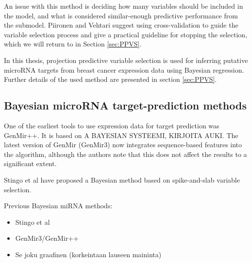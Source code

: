 An issue with this method is deciding how many variables should be included
in the model, and what is considered similar-enough predictive performance
from the submodel. Piironen and Vehtari suggest using cross-validation
to guide the variable selection process and give a practical guideline
for stopping the selection, which we will return to in Section \ref{sec:PPVS}.

In this thesis, projection predictive variable selection is used for
inferring putative microRNA targets from breast cancer expression
data using Bayesian regression. Further details of the used method are
presented in section \ref{sec:PPVS}.


\subsection{Bayesian microRNA target-prediction methods}


One of the earliest tools to use expression data for target prediction was
GenMir++. It is based on A BAYESIAN SYSTEEMI, KIRJOITA AUKI.
The latest version of GenMir (GenMir3) now integrates sequence-based features
into the algorithm, although the authors note that this does not affect the
results to a significant extent.

Stingo et al have proposed a Bayesian method based on spike-and-slab variable
selection.

Previous Bayesian miRNA methods:
\begin{itemize}
  \item Stingo et al
  \item GenMir3/GenMir++
  \item Se joku graafinen (korkeintaan lauseen maininta)
\end{itemize}



